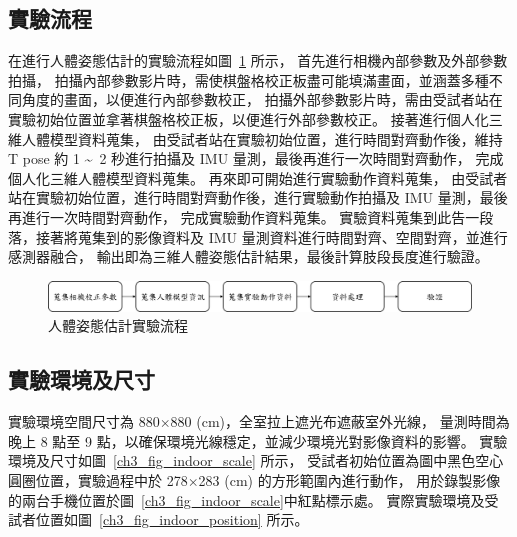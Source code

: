 \subsection{實驗流程}
在進行人體姿態估計的實驗流程如圖~\ref{ch3_fig_exp_flow} 所示，
首先進行相機內部參數及外部參數拍攝，
拍攝內部參數影片時，需使棋盤格校正板盡可能填滿畫面，並涵蓋多種不同角度的畫面，以便進行內部參數校正，
拍攝外部參數影片時，需由受試者站在實驗初始位置並拿著棋盤格校正板，以便進行外部參數校正。
接著進行個人化三維人體模型資料蒐集，
由受試者站在實驗初始位置，進行時間對齊動作後，維持 T pose 約 1 \textasciitilde\ 2 秒進行拍攝及 IMU 量測，最後再進行一次時間對齊動作，
完成個人化三維人體模型資料蒐集。
再來即可開始進行實驗動作資料蒐集，
由受試者站在實驗初始位置，進行時間對齊動作後，進行實驗動作拍攝及 IMU 量測，最後再進行一次時間對齊動作，
完成實驗動作資料蒐集。
實驗資料蒐集到此告一段落，接著將蒐集到的影像資料及 IMU 量測資料進行時間對齊、空間對齊，並進行感測器融合，
輸出即為三維人體姿態估計結果，最後計算肢段長度進行驗證。

\begin{figure}[!ht]
   \centering
   \includegraphics[width=\linewidth]{figure/ch3_fig_exp_flow.png}
    \caption[人體姿態估計實驗流程]{人體姿態估計實驗流程}
    \label{ch3_fig_exp_flow}
\end{figure}


\subsection{實驗環境及尺寸}
實驗環境空間尺寸為 880$\times$880 (cm)，全室拉上遮光布遮蔽室外光線，
量測時間為晚上 8 點至 9 點，以確保環境光線穩定，並減少環境光對影像資料的影響。
實驗環境及尺寸如圖~\ref{ch3_fig_indoor_scale} 所示，
受試者初始位置為圖中黑色空心圓圈位置，實驗過程中於 278$\times$283 (cm) 的方形範圍內進行動作，
用於錄製影像的兩台手機位置於圖~\ref{ch3_fig_indoor_scale}中紅點標示處。
實際實驗環境及受試者位置如圖~\ref{ch3_fig_indoor_position} 所示。

